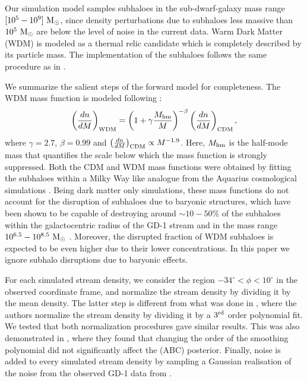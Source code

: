 \documentclass[fleqn,usenatbib]{mnras}
\begin{document}
\medskip

Our simulation model samples subhaloes in the sub-dwarf-galaxy mass range $[10^{5} - 10^{9}] \ \textrm{M}_\odot$, since density perturbations due to subhaloes less massive than $10^{5} \ \textrm{M}_\odot$ are below the level of noise in the current data.
Warm Dark Matter (WDM) is modeled as a thermal relic candidate which is completely described by its particle mass.
The implementation of the subhaloes follows the same procedure as in \citep{Bovy2016a,banik2018probing,banik2019evidence}.

\medskip

We summarize the salient steps of the forward model for completeness. 
The WDM mass function is modeled following \citet{Lovell2013}:
\begin{equation}
\left(\frac{dn}{dM}\right)_{\rm{WDM}} =  \left(1+ \gamma\frac{M_{\rm{hm}}}{M}\right)^{-\beta} \left(\frac{dn}{dM}\right)_{\rm{CDM}},
\label{eq:wdmcdm}
\end{equation}
where $\gamma = 2.7$, $\beta = 0.99$ and $\left(\frac{dn}{dM}\right)_{\rm{CDM}} \propto M^{-1.9}$. Here, $M_{\rm{hm}}$ is the half-mode mass that quantifies the scale below which the mass function is strongly suppressed. Both the CDM and WDM mass functions were obtained by fitting the subhaloes within a Milky Way like analogue from the Aquarius cosmological simulations \citep{Springel2008}. Being dark matter only simulations, these mass functions do not account for the disruption of subhaloes due to baryonic structures, which have been shown to be capable of destroying around $\sim 10 - 50 \%$ of the subhaloes within the galactocentric radius of the GD-1 stream and in the mass range $10^{6.5} - 10^{8.5}~\textrm{M}_\odot$ \citep{DOnghia2010,Sawala2016,GarrisonKimmel17a,Webb20b}. 
Moreover, the disrupted fraction of WDM subhaloes is expected to be even higher due to their lower concentrations.
In this paper we ignore subhalo disruptions due to baryonic effects.

\medskip

For each simulated stream density, we consider the region $-34^{\circ} < \phi < 10^{\circ}$ in the observed coordinate frame, and normalize the stream density by dividing it by the mean density. The latter step is different from what was done in \citep{Bovy2016a,banik2019evidence}, where the authors normalize the stream density by dividing it by a $3^{\rm{rd}}$ order polynomial fit.
We tested that both normalization procedures gave similar results. This was also demonstrated in \citet{Bovy2016a}, where they found that changing the order of the smoothing polynomial did not significantly affect the (ABC) posterior. Finally, noise is added to every simulated stream density by sampling a Gaussian realisation of the noise from the observed GD-1 data from \citet{Boer2019}.
\end{document}
